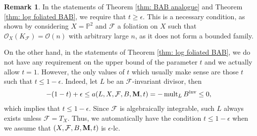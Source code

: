 \documentclass[12pt]{amsart}
\numberwithin{equation}{section}
\newcommand{\Mm}{{\bf{M}}}
\newcommand{\inv}{\operatorname{inv}}
\newcommand{\mult}{\operatorname{mult}}
\newcommand{\Ff}{\mathcal{F}}
\theoremstyle{definition}
\theoremstyle{definition}
\newtheorem{rem}[thm]{Remark}
\theoremstyle{definition}
\begin{document}
\begin{rem}
In the statements of Theorem \ref{thm: BAB analogue} and Theorem \ref{thm: log foliated BAB}, we require that $t\geq\epsilon$. This is a necessary condition, as shown by considering $X=\mathbb P^2$ and $\Ff$ a foliation on $X$ such that $\mathcal{O}_X(K_{\Ff})=\mathcal{O}(n)$ with arbitrary large $n$, as it does not form a bounded family.

On the other hand, in the statements of Theorem \ref{thm: log foliated BAB}, we do not have any requirement on the upper bound of the parameter $t$ and we actually allow $t=1$. However, the only values of $t$ which usually make sense are those $t$ such that $t\leq 1-\epsilon$. Indeed, let $L$ be an $\Ff$-invariant divisor, then
$$-(1-t)+\epsilon\leq a(L,X,\Ff,B,\Mm,t)=-\mult_LB^{\inv}\leq 0,$$
which implies that $t\leq 1-\epsilon$. Since $\mathcal F$ is algebraically integrable, such $L$ always exists 
unless $\Ff=T_X$. Thus, we automatically have the condition $t\leq 1-\epsilon$ when we assume that $(X,\Ff,B,\Mm,t)$ is $\epsilon$-lc.
\end{rem}
\end{document}
